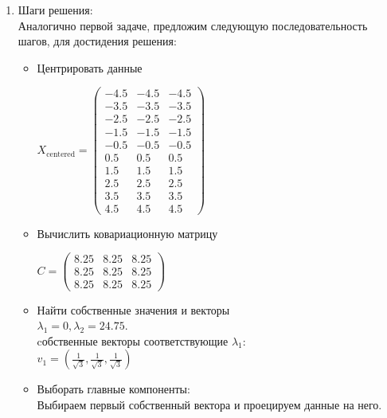 \begin{enumerate}
    \item Шаги решения:\\
          Аналогично первой задаче, предложим следующую последовательность шагов, для достидения решения: \\
          \begin{itemize}
              \item Центрировать данные \\
                    \begin{center}
                        $X_\text{centered} =
                            \begin{pmatrix}
                                -4.5 & -4.5 & -4.5 \\
                                -3.5 & -3.5 & -3.5 \\
                                -2.5 & -2.5 & -2.5 \\
                                -1.5 & -1.5 & -1.5 \\
                                -0.5 & -0.5 & -0.5 \\
                                0.5  & 0.5  & 0.5  \\
                                1.5  & 1.5  & 1.5  \\
                                2.5  & 2.5  & 2.5  \\
                                3.5  & 3.5  & 3.5  \\
                                4.5  & 4.5  & 4.5
                            \end{pmatrix}$\par
                    \end{center}
              \item Вычислить ковариационную матрицу \\
                    \begin{center}
                        $C=
                            \begin{pmatrix}
                                8.25 & 8.25 & 8.25 \\
                                8.25 & 8.25 & 8.25 \\
                                8.25 & 8.25 & 8.25
                            \end{pmatrix}$\par
                    \end{center}
              \item Найти собственные значения и векторы \\
                    $\lambda_1 = 0, \lambda_2 = 24.75$.\\
                    cобственные векторы соответствующие $\lambda_1$:  \\
                    $v_1 = (\frac{1}{\sqrt{3}}, \frac{1}{\sqrt{3}}, \frac{1}{\sqrt{3}})$
              \item Выборать главные компоненты: \\
                    Выбираем первый собственный вектора и проецируем данные на него.
          \end{itemize}


\end{enumerate}
